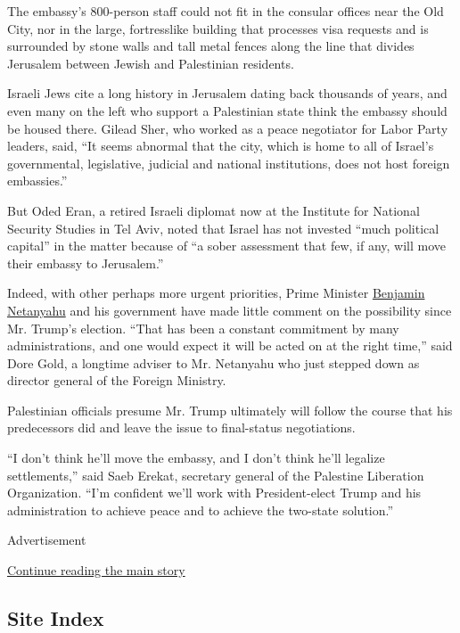 The embassy's 800-person staff could not fit in the consular offices
near the Old City, nor in the large, fortresslike building that
processes visa requests and is surrounded by stone walls and tall metal
fences along the line that divides Jerusalem between Jewish and
Palestinian residents.

Israeli Jews cite a long history in Jerusalem dating back thousands of
years, and even many on the left who support a Palestinian state think
the embassy should be housed there. Gilead Sher, who worked as a peace
negotiator for Labor Party leaders, said, ``It seems abnormal that the
city, which is home to all of Israel's governmental, legislative,
judicial and national institutions, does not host foreign embassies.''

But Oded Eran, a retired Israeli diplomat now at the Institute for
National Security Studies in Tel Aviv, noted that Israel has not
invested ``much political capital'' in the matter because of ``a sober
assessment that few, if any, will move their embassy to Jerusalem.''

Indeed, with other perhaps more urgent priorities, Prime Minister
\href{http://www.nytimes.com/topic/person/benjamin-netanyahu?inline=nyt-per}{Benjamin
Netanyahu} and his government have made little comment on the
possibility since Mr. Trump's election. ``That has been a constant
commitment by many administrations, and one would expect it will be
acted on at the right time,'' said Dore Gold, a longtime adviser to Mr.
Netanyahu who just stepped down as director general of the Foreign
Ministry.

Palestinian officials presume Mr. Trump ultimately will follow the
course that his predecessors did and leave the issue to final-status
negotiations.

``I don't think he'll move the embassy, and I don't think he'll legalize
settlements,'' said Saeb Erekat, secretary general of the Palestine
Liberation Organization. ``I'm confident we'll work with President-elect
Trump and his administration to achieve peace and to achieve the
two-state solution.''

Advertisement

\protect\hyperlink{after-bottom}{Continue reading the main story}

\hypertarget{site-index}{%
\subsection{Site Index}\label{site-index}}

